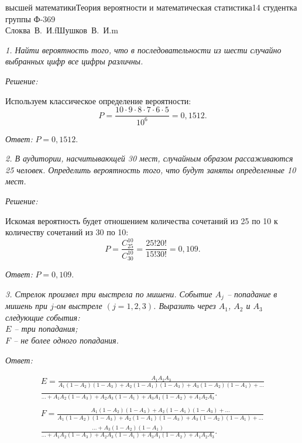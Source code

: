 




{высшей математики}{Теория вероятности и математическая статистика}{}{14}
{студентка группы Ф-369\\Слоква~В.~И.}{f}{Шушков~В.~И.}{m}

\emph{1. Найти вероятность того, что в последовательности из шести случайно выбранных
цифр все цифры различны.}

\vspace*{2em}
\emph{Решение:}

Используем классическое определение вероятности:
\[
    P = \frac{10\cdot 9\cdot 8\cdot 7\cdot 6\cdot 5}{10^6} = 0,1512.
\]

\vspace*{2em}
\emph{Ответ:} \( P = 0,1512 \).

\vspace*{3em}

\emph{2. В аудитории, насчитывающей 30 мест, случайным образом рассаживаются 25
человек. Определить вероятность того, что будут заняты определенные 10 мест.}

\vspace*{2em}
\emph{Решение:}

Искомая вероятность будет отношением количества сочетаний из 25 по 10 к
количеству сочетаний из 30 по 10:
\[
    P = \frac{C_{25}^{10}}{C_{30}^{10}} = \frac{25!20!}{15!30!} = 0,109.
\]

\vspace*{2em}
\emph{Ответ:} \( P = 0,109 \).

\pagebreak

\emph{3. Стрелок произвел три выстрела по мишени. Событие \( A_j \) -- попадание в
мишень при \( j \)-ом выстреле \( (j = 1, 2, 3) \). Выразить через \( A_1 \),
\( A_2 \) и \( A_3 \) следующие события: \\
\( E \) -- три попадания; \\
\( F \) -- не более одного попадания.}

\vspace*{2em}
\emph{Ответ:}

\begin{align*}
    E = \frac{A_1A_2A_3}{A_1(1-A_2)(1-A_3) + A_2(1-A_1)(1-A_3) + A_3(1-A_2)
    (1-A_1) + \ldots} \\
    \frac{}{\ldots + A_1A_2(1-A_3) + A_2A_3(1-A_1) + A_3A_1(1-A_2) + A_1A_2A_3}.
    \\ \\
    F = \frac{A_1(1-A_2)(1-A_3) + A_2(1-A_1)(1-A_3) + \ldots}{A_1(1-A_2)(1-A_3)
    + A_2(1-A_1)(1-A_3) + A_3(1-A_2)(1-A_1) + \ldots} \\
    \frac{\ldots + A_3(1-A_2)(1-A_1)}{\ldots + A_1A_2(1-A_3) + A_2A_3(1-A_1) +
    A_3A_1(1-A_2) + A_1A_2A_3}.
\end{align*}

